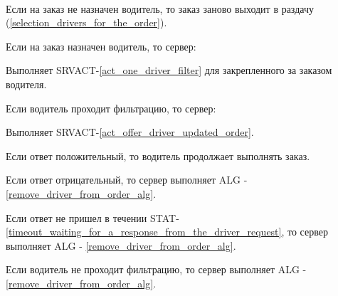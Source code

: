       \begin{alg}\label{edit_order_alg} \mbox{}\\
        \begin{longenum}
          \item Если на заказ не назначен водитель, то заказ заново выходит в раздачу (\ref{selection_drivers_for_the_order}).
          \item Если на заказ назначен водитель, то сервер:
          \begin{longenum}
            \item Выполняет SRVACT-\ref{act_one_driver_filter} для закрепленного за заказом водителя.
              \begin{longenum}
                \item Если водитель проходит фильтрацию, то сервер:
                  \begin{longenum}
                   \item Выполняет SRVACT-\ref{act_offer_driver_updated_order}.
                     \begin{longenum}
                      \item Если ответ положительный, то водитель продолжает выполнять заказ.
                      \item Если ответ отрицательный, то сервер выполняет ALG - \ref{remove_driver_from_order_alg}.
                      \item Если ответ не пришел в течении STAT-\ref{timeout_waiting_for_a_response_from_the_driver_request}, то сервер выполняет ALG - \ref{remove_driver_from_order_alg}.
                     \end{longenum}
                  \end{longenum}
                \item Если водитель не проходит фильтрацию, то сервер выполняет ALG - \ref{remove_driver_from_order_alg}. 
              \end{longenum}
          \end{longenum}
        \end{longenum}
      \end{alg}


